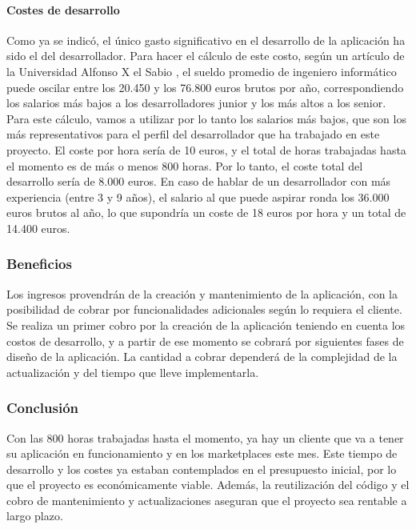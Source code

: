 \paragraph{Costes de desarrollo}
\label{par:analisis_estudio_viabilidad_economica_costes_desarrollo}

Como ya se indicó, el único gasto significativo en el desarrollo de la aplicación ha sido el del desarrollador. Para hacer el 
cálculo de este costo, según un artículo de la Universidad Alfonso X el Sabio \cite{coste_desarrollador},
el sueldo promedio de ingeniero informático puede oscilar entre los 20.450 y los 76.800 euros brutos por año, correspondiendo los
salarios más bajos a los desarrolladores junior y los más altos a los senior. Para este cálculo, vamos a utilizar por lo tanto 
los salarios más bajos, que son los más representativos para el perfil del desarrollador que ha trabajado en este proyecto. 
El coste por hora sería de 10 euros, y el total de horas trabajadas hasta el momento es de más o menos 800 horas. Por lo tanto, el coste
total del desarrollo sería de 8.000 euros. En caso de hablar de un desarrollador con más experiencia (entre 3 y 9 años), el salario al 
que puede aspirar ronda los 36.000 euros brutos al año, lo que supondría un coste de 18 euros por hora y un total de 14.400 euros.

\subsubsection{Beneficios}
\label{subsubsec:analisis_estudio_viabilidad_economica_beneficios}

Los ingresos provendrán de la creación y mantenimiento de la aplicación, con la posibilidad de cobrar por 
funcionalidades adicionales según lo requiera el cliente. Se realiza un primer cobro por la creación de la
aplicación teniendo en cuenta los costos de desarrollo, y a partir de ese momento se cobrará por siguientes fases de diseño 
de la aplicación. La cantidad a cobrar dependerá de la complejidad de la actualización y del tiempo que lleve implementarla.

\subsubsection{Conclusión}
\label{subsubsec:analisis_estudio_viabilidad_economica_conclusion}

Con las 800 horas trabajadas hasta el momento, ya hay un cliente que va a tener su aplicación en funcionamiento y en los marketplaces
este mes. Este tiempo de desarrollo y los costes ya estaban contemplados en el presupuesto inicial, por lo que
el proyecto es económicamente viable. Además, la reutilización del código y el cobro de mantenimiento y actualizaciones
aseguran que el proyecto sea rentable a largo plazo.

